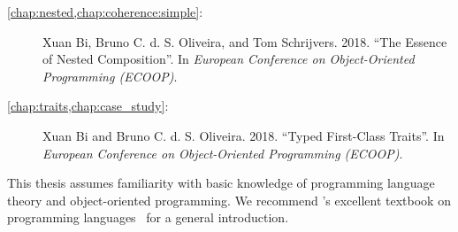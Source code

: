 \begin{description}
\item[\cref{chap:nested,chap:coherence:simple}:] Xuan Bi, Bruno C. d. S.
  Oliveira, and Tom Schrijvers. 2018. ``The Essence of Nested Composition''. In
  \emph{European Conference on Object-Oriented Programming (ECOOP)}.
\item[\cref{chap:traits,chap:case_study}:] Xuan Bi and Bruno C. d. S. Oliveira.
  2018. ``Typed First-Class Traits''. In \emph{European Conference on Object-Oriented Programming (ECOOP)}.
\end{description}

\noindent\makebox[\linewidth]{\rule{0.7\textwidth}{0.4pt}}

\vspace{1.5\baselineskip}

This thesis assumes familiarity with basic knowledge of programming language
theory and object-oriented programming. We recommend
\citeauthor{DBLP:books/daglib/0005958}'s excellent textbook on programming
languages~\citep{DBLP:books/daglib/0005958} for a general introduction.


